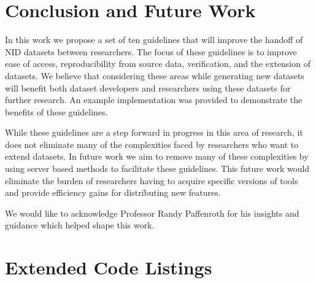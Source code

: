 \documentclass[sigconf, anonymous, screen, review]{acmart}
\begin{document}
\section{Conclusion and Future Work}\label{sec:conclusion}
In this work we propose a set of ten guidelines that will improve the handoff of NID datasets between researchers.
The focus of these guidelines is to improve ease of access, reproducibility from source data, verification, and the extension of datasets.
We believe that considering these areas while generating new datasets will benefit both dataset developers and researchers using these datasets for further research.
An example implementation was provided to demonstrate the benefits of these guidelines.

While these guidelines are a step forward in progress in this area of research, it does not eliminate many of the complexities faced by researchers who want to extend datasets.
In future work we aim to remove many of these complexities by using server based methods to facilitate these guidelines.
This future work would eliminate the burden of researchers having to acquire specific versions of tools and provide efficiency gains for distributing new features.

\begin{acks}
    We would like to acknowledge Professor Randy Paffenroth for his insights and guidance which helped shape this work.
\end{acks}




\appendix
\section{Extended Code Listings}
\end{document}
